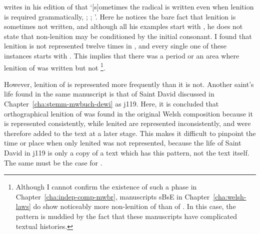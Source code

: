 \Textcite[107n]{Sim_Buchedd18} writes in his edition of  that `[s]ometimes the radical is written even when lenition is required grammatically, \eg {}; ; '. Here he notices the bare fact that lenition is sometimes not written, and although all his examples start with ,  he does not state that non-lenition may be conditioned by the initial consonant. I found that lenition is not represented twelve times in , and every single one of these instances starts with . This implies that there was a period or an area where lenition of  was written but not \footnote{Although I cannot confirm the existence of such a phase in Chapter~\ref{cha:indep-comp-mwbr}, manuscripts \gls{sB}\gls{sE} in Chapter~\ref{cha:welsh-laws} do show noticeably more non-lenition of  than of . In this case, the pattern is muddied by the fact that these manuscripts have complicated textual histories.}.

However, lenition of  is represented more frequently than it is not. Another saint's life found in the same manuscript  is that of Saint David discussed in Chapter~\ref{cha:stemm-mwbuch-dewi} as \gls{j119}. Here, it is concluded that orthographical lenition of  was found in the original Welsh composition because it is represented consistently, while lenited  are represented inconsistently, and were therefore added to the text at a later stage. This makes it difficult to pinpoint the time or place when only lenited  was not represented, because the life of Saint David in \gls{j119} is only a copy of a text which has this pattern, not the text itself. The same must be the case for .

